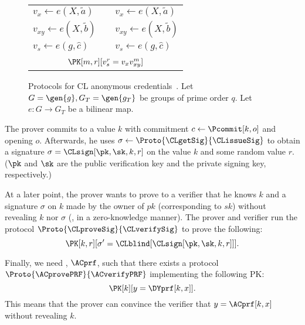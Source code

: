 \begin{figure}
\begin{tabular}{lcl}
    \(v_x\gets e(X, \tilde a)\)
    &
    & \(v_x\gets e(X, \tilde a)\)

    \\

    \(v_{xy}\gets e(X, \tilde b)\)
    &
    & \(v_{xy}\gets e(X, \tilde b)\)

    \\

    \(v_s\gets e(g, \hat c)\)
    &
    & \(v_s\gets e(g, \hat c)\)

    \\\\

    \multicolumn{3}{c}{\(\PK[m,r][v_s^r = v_x v_{xy}^m]\)}

    \\\bottomrule
  \end{tabular}
  \caption{\label{CLacAlg}%
    Protocols for CL anonymous credentials~\cite{CLsignatures}.
    Let \(G = \gen{g}, G_T = \gen{g_T}\) be groups of prime order \(q\).
    Let \(e\colon G\to G_T\) be a bilinear map.
  }
\end{figure}

The prover commits to a value \(k\) with commitment \(c\gets \Pcommit[k, o]\) 
and opening \(o\).
Afterwards, he uses \(\sigma\gets \Proto{\CLgetSig}{\CLissueSig}\) to obtain a 
signature \(\sigma = \CLsign[\pk, \sk, k, r]\) on the value \(k\) and some 
random value \(r\).
(\(\pk\) and \(\sk\) are the public verification key and the private signing 
key, respectively.)

At a later point, the prover wants to prove to a verifier that he knows \(k\) and a signature \(\sigma\) on \(k\) made by the owner of \(pk\) (corresponding to \(sk\)) without revealing \(k\) nor \(\sigma\) (\ie, in a zero-knowledge manner).
The prover and verifier run the protocol \(\Proto{\CLproveSig}{\CLverifySig}\) 
to prove the following:
\begin{equation*}
  \PK[k, r][\sigma' = \CLblind[\CLsign[\pk, \sk, k, r]]].
\end{equation*}

Finally, we need , \(\ACprf\), such that there exists a protocol 
\(\Proto{\ACprovePRF}{\ACverifyPRF}\) implementing the following \ac{PK}:
\begin{equation*}
  \PK[k][y = \DYprf[k, x]].
\end{equation*}
This means that the prover can convince the verifier that \(y = \ACprf[k, x]\) 
without revealing \(k\).

